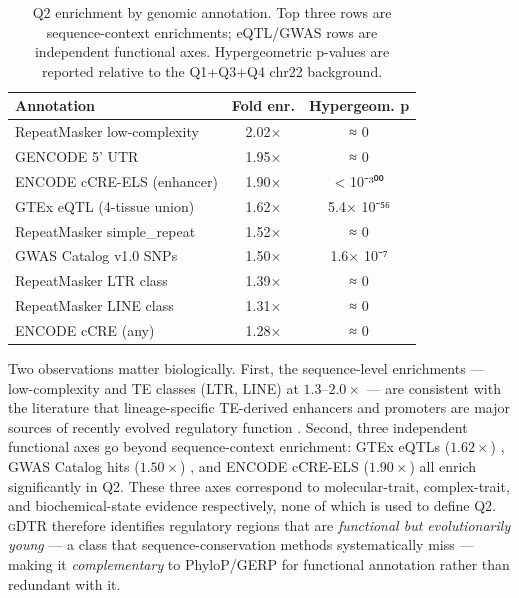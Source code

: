 \documentclass[12pt]{article}
\theoremstyle{plain}
\theoremstyle{definition}
\theoremstyle{remark}
\newcommand{\gDTR}{\textsc{gDTR}}
\begin{document}
\begin{table}[t]
\caption{Q2 enrichment by genomic annotation. Top three rows are
sequence-context enrichments; eQTL/GWAS rows are independent functional
axes. Hypergeometric p-values are reported relative to the Q1+Q3+Q4
chr22 background.}
\label{tab:q2}
\centering
\small
\begin{tabular}{@{}lcc@{}}
\toprule
Annotation & Fold enr. & Hypergeom. p \\
\midrule
RepeatMasker low-complexity   & 2.02× & ≈ 0 \\
GENCODE 5' UTR              & 1.95× & ≈ 0 \\
ENCODE cCRE-ELS (enhancer)    & 1.90× & < 10⁻³⁰⁰ \\
GTEx eQTL (4-tissue union)    & 1.62× & 5.4× 10⁻⁵⁶ \\
RepeatMasker simple\_repeat   & 1.52× & ≈ 0 \\
GWAS Catalog v1.0 SNPs        & 1.50× & 1.6× 10⁻⁷ \\
RepeatMasker LTR class        & 1.39× & ≈ 0 \\
RepeatMasker LINE class       & 1.31× & ≈ 0 \\
ENCODE cCRE (any)             & 1.28× & ≈ 0 \\
\bottomrule
\end{tabular}
\end{table}

Two observations matter biologically. First, the sequence-level
enrichments --- low-complexity and TE classes (LTR, LINE) at
$1.3$--$2.0\times$ --- are consistent with the literature that
lineage-specific TE-derived enhancers and promoters are major sources
of recently evolved regulatory function \cite{chuong2017regulatory}.
Second, three independent functional axes go beyond sequence-context
enrichment: GTEx eQTLs ($1.62\times$) \cite{gtex2020}, GWAS Catalog
hits ($1.50\times$) \cite{sollis2023gwas}, and ENCODE cCRE-ELS
($1.90\times$) \cite{moore2020encode} all enrich significantly in Q2.
These three axes correspond to molecular-trait, complex-trait, and
biochemical-state evidence respectively, none of which is used to
define Q2. \gDTR{} therefore identifies regulatory regions that are
\emph{functional but evolutionarily young} --- a class that
sequence-conservation methods systematically miss --- making it
\emph{complementary} to PhyloP/GERP for functional annotation rather
than redundant with it.
\end{document}
